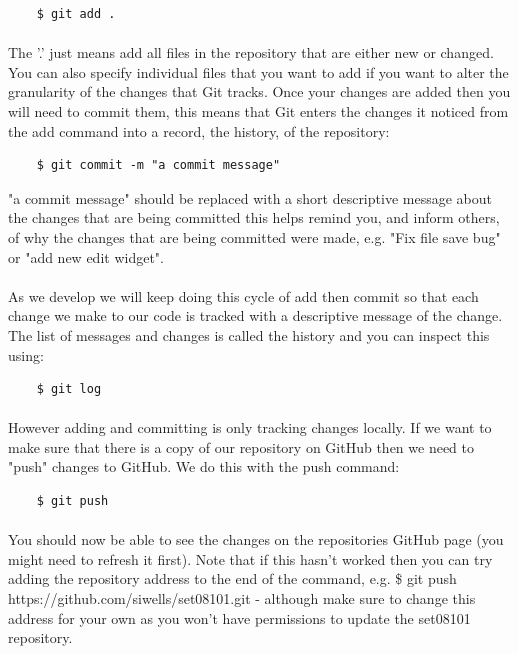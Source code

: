 \documentclass[10pt, a4paper, twosize]{article}
\begin{document}
\begin{lstlisting}
    $ git add .
\end{lstlisting}

\paragraph{} The '.' just means add all files in the repository that are either new or changed. You can also specify individual files that you want to add if you want to alter the granularity of the changes that Git tracks. Once your changes are added then you will need to commit them, this means that Git enters the changes it noticed from the add command into a record, the history, of the repository:

\begin{lstlisting}
    $ git commit -m "a commit message"
\end{lstlisting}

"a commit message" should be replaced with a short descriptive message about the changes that are being committed this helps remind you, and inform others, of why the changes that are being committed were made, e.g. "Fix file save bug" or "add new edit widget".

\paragraph{} As we develop we will keep doing this cycle of add then commit so that each change we make to our code is tracked with a descriptive message of the change. The list of messages and changes is called the history and you can inspect this using:
    
\begin{lstlisting}
    $ git log
\end{lstlisting}

\paragraph{} However adding and committing is only tracking changes locally. If we want to make sure that there is a copy of our repository on GitHub then we need to "push" changes to GitHub. We do this with the push command:

\begin{lstlisting}
    $ git push
\end{lstlisting}

\paragraph{} You should now be able to see the changes on the repositories GitHub page (you might need to refresh it first). Note that if this hasn't worked then you can try adding the repository address to the end of the command, e.g. \$ git push https://github.com/siwells/set08101.git - although make sure to change this address for your own as you won't have permissions to update the set08101 repository.
\end{document}
